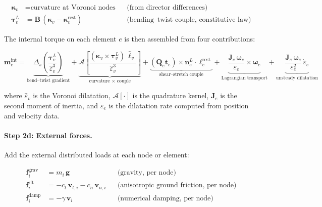 \documentclass[11pt]{article}
\newcommand{\vect}[1]{\mathbf{#1}}
\newcommand{\mat}[1]{\mathbf{#1}}
\begin{document}
\begin{subequations}
\label{eq:bend-twist}
\begin{align}
  \bm{\kappa}_v &= \text{curvature at Voronoi nodes}
    && \text{(from director differences)}
  \label{eq:curvature-discrete} \\[4pt]
  \bm{\tau}_v^L &= \mat{B}\,(\bm{\kappa}_v - \bm{\kappa}_v^{\text{rest}})
    && \text{(bending--twist couple, constitutive law)}
  \label{eq:couple-constitutive}
\end{align}
\end{subequations}

\noindent
The internal torque on each element $e$ is then assembled from four contributions:

\begin{equation}
  \vect{m}_e^{\text{int}} =
    \underbrace{\Delta_s\!\left(\frac{\bm{\tau}_v^L}{\hat{\varepsilon}_v^3}\right)}_{\text{bend--twist gradient}}
    + \underbrace{\mathcal{A}\!\left[\frac{(\bm{\kappa}_v \times \bm{\tau}_v^L)\,\hat{\ell}_v}{\hat{\varepsilon}_v^3}\right]}_{\text{curvature $\times$ couple}}
    + \underbrace{(\mat{Q}_e\vect{t}_e) \times \vect{n}_e^L \cdot \ell_e^{\text{rest}}}_{\text{shear--stretch couple}}
    + \underbrace{\frac{\mat{J}_e\,\bm{\omega}_e}{\varepsilon_e} \times \bm{\omega}_e}_{\text{Lagrangian transport}}
    + \underbrace{\frac{\mat{J}_e\,\bm{\omega}_e}{\varepsilon_e^2}\,\dot{\varepsilon}_e}_{\text{unsteady dilatation}}
  \label{eq:internal-torque}
\end{equation}

\noindent
where $\hat{\varepsilon}_v$ is the Voronoi dilatation, $\mathcal{A}[\cdot]$ is the quadrature kernel, $\mat{J}_e$ is the second moment of inertia, and $\dot{\varepsilon}_e$ is the dilatation rate computed from position and velocity data.

\paragraph{Step 2d: External forces.}
Add the external distributed loads at each node or element:

\begin{subequations}
\label{eq:external}
\begin{align}
  \vect{f}_{i}^{\text{grav}} &= m_i\,\vect{g}
    && \text{(gravity, per node)}
  \label{eq:gravity} \\[4pt]
  \vect{f}_{i}^{\text{rft}} &= -c_t\,\vect{v}_{t,i} - c_n\,\vect{v}_{n,i}
    && \text{(anisotropic ground friction, per node)}
  \label{eq:rft} \\[4pt]
  \vect{f}_{i}^{\text{damp}} &= -\gamma\,\vect{v}_i
    && \text{(numerical damping, per node)}
  \label{eq:damping}
\end{align}
\end{subequations}
\end{document}
